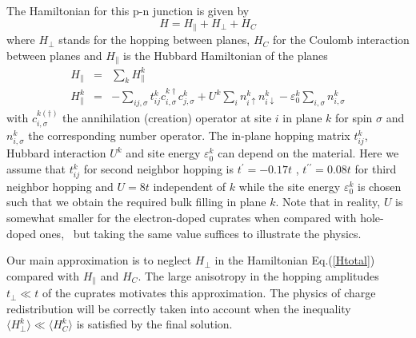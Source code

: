 \documentclass[twocolumn, preprintnumbers,prb,aps,amssymb,showpacs]{revtex4}
\begin{document}
The Hamiltonian for this p-n junction is given by
\begin{equation}
H = H_{\parallel}+H_{\perp}+H_{C}
\label{Htotal}
\end{equation}
where $H_{\perp}$ stands for the hopping between planes, $H_{C}$ for the Coulomb interaction between planes and $H_{\parallel}$ is the Hubbard Hamiltonian of the planes 
\begin{eqnarray}
H_{\parallel}&=&\sum_k  H_{\parallel}^k \nonumber \\
H_{\parallel}^k &=&-\sum_{ij,\sigma}t^k_{ij}c_{i,\sigma }^{k\dag}c^k_{j,\sigma
}+U^k\sum_{i}n^k_{i\uparrow }n^k_{i\downarrow }-\varepsilon ^k_{0}\sum_{i,\sigma
}n^k_{i,\sigma }
\end{eqnarray}%
with $c_{i,\sigma }^{k(\dag)}$ the annihilation (creation) operator at site $i$ in plane $k$ for spin $\sigma$ and $n^k_{i,\sigma}$ the corresponding number operator.  The in-plane hopping matrix $t^k_{ij}$,  Hubbard interaction $U^k$ and site energy $\varepsilon ^k_{0}$ can depend on the material. Here we assume that $t^k_{ij}$ for second neighbor hopping is $t^{\prime}=-0.17t$ \cite{pavarini_band-structure_2001}, $t^{\prime\prime}=0.08t$ for third neighbor hopping and $U=8t$ independent of $k$ while the site energy $\varepsilon ^k_{0}$ is chosen such that we obtain the required bulk filling in plane $k$. Note that in reality, $U$ is somewhat smaller for the electron-doped cuprates when compared with hole-doped ones,~\cite{SenechalHot:2004,Weber:2010} but taking the same value suffices to illustrate the physics. 

Our main approximation is to neglect $H_{\perp}$ in the Hamiltonian Eq.(\ref{Htotal}) compared with $H_{\parallel}$ and $H_{C}$. The large anisotropy in the hopping amplitudes $t_{\perp}\ll t$ of the cuprates motivates this approximation. The physics of charge redistribution will be correctly taken into account when the inequality $\langle H^k_{\perp} \rangle \ll \langle H^k_{C} \rangle$ is satisfied by the final solution. 
\end{document}
